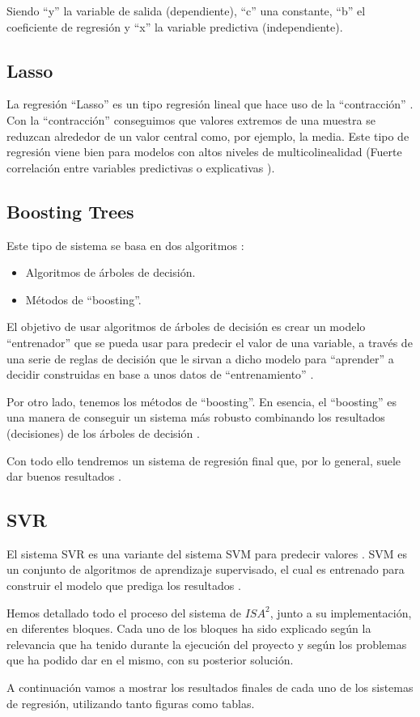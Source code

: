Siendo ``y'' la variable de salida (dependiente), ``c'' una constante, ``b'' el coeficiente de regresión y ``x'' la variable predictiva (independiente).

\subsection{Lasso}

La regresión ``Lasso'' \cite{lasso} es un tipo regresión lineal que hace uso de la ``contracción'' \cite{shrinkage}. Con la ``contracción'' conseguimos que valores extremos de una muestra se reduzcan alrededor de un valor central como, por ejemplo, la media. Este tipo de regresión viene bien para modelos con altos niveles de multicolinealidad (Fuerte correlación entre variables predictivas o explicativas \cite{multicollinearity}).

\subsection{Boosting Trees}

Este tipo de sistema se basa en dos algoritmos \cite{boosting-trees}:

\begin{itemize}
\item Algoritmos de árboles de decisión.
\item Métodos de ``boosting''.
\end{itemize}

El objetivo de usar algoritmos de árboles de decisión es crear un modelo ``entrenador'' que se pueda usar para predecir el valor de una variable, a través de una serie de reglas de decisión que le sirvan a dicho modelo para ``aprender'' a decidir construidas en base a unos datos de ``entrenamiento'' \cite{decision-tree}.

Por otro lado, tenemos los métodos de ``boosting''. En esencia, el ``boosting'' es una manera de conseguir un sistema más robusto combinando los resultados (decisiones) de los árboles de decisión \cite{boosting}.

Con todo ello tendremos un sistema de regresión final que, por lo general, suele dar buenos resultados \cite{isa2}.

\subsection{SVR}

El sistema \ac{SVR} es una variante del sistema \ac{SVM} para predecir valores \cite{SVR}. \ac{SVM} es un conjunto de algoritmos de aprendizaje supervisado, el cual es entrenado para construir el modelo que prediga los resultados \cite{SVR}.

Hemos detallado todo el proceso del sistema de $ISA^{2}$, junto a su implementación, en diferentes bloques. Cada uno de los bloques ha sido explicado según la relevancia que ha tenido durante la ejecución del proyecto y según los problemas que ha podido dar en el mismo, con su posterior solución.

A continuación vamos a mostrar los resultados finales de cada uno de los sistemas de regresión, utilizando tanto figuras como tablas.

